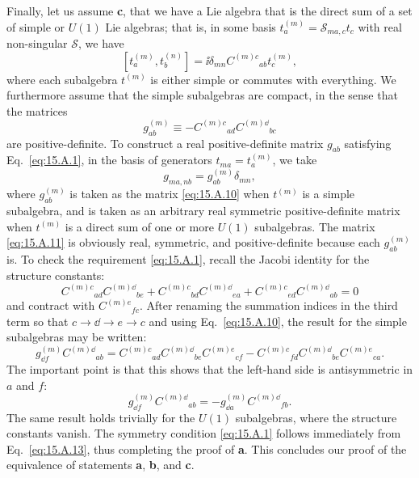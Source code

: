 Finally, let us assume \textbf{c}, that we have a Lie algebra that is the direct sum of a set of simple or $U(1)$ Lie algebras; that is, in some basis $t_a^{(m)}=\mathcal S_{ma,c}t_c$ with real non-singular $\mathcal S$, we have
\[
 [t_a^{(m)},t_b^{(n)}]
 =\ii\delta_{mn}C^{(m)c}{}_{ab}t_c^{(m)},
\]
where each subalgebra $t^{(m)}$ is either simple or commutes with everything. We furthermore assume that the simple subalgebras are compact, in the sense that the matrices
\begin{equation}
 g_{ab}^{(m)}\equiv-C^{(m)c}{}_{ad}C^{(m)\dd}{}_{bc}
 \tag{15.A.10}\label{eq:15.A.10}
\end{equation}
are positive-definite. To construct a real positive-definite matrix $g_{ab}$ satisfying Eq.~\eqref{eq:15.A.1}, in the basis of generators $t_{ma}=t_a^{(m)}$, we take
\begin{equation}
 g_{ma,nb}=g_{ab}^{(m)}\delta_{mn},
 \tag{15.A.11}\label{eq:15.A.11}
\end{equation}
where $g_{ab}^{(m)}$ is taken as the matrix \eqref{eq:15.A.10} when $t^{(m)}$ is a simple subalgebra, and is taken as an arbitrary real symmetric positive-definite matrix when $t^{(m)}$ is a direct sum of one or more $U(1)$ subalgebras. The matrix \eqref{eq:15.A.11} is obviously real, symmetric, and positive-definite because each $g_{ab}^{(m)}$ is. To check the requirement \eqref{eq:15.A.1}, recall the Jacobi identity for the structure constants:
\begin{equation}
 C^{(m)c}{}_{ad}C^{(m)\dd}{}_{be}
 +C^{(m)c}{}_{bd}C^{(m)\dd}{}_{ea}
 +C^{(m)c}{}_{ed}C^{(m)\dd}{}_{ab}=0
 \tag{15.A.12}\label{eq:15.A.12}
\end{equation}
and contract with $C^{(m)e}{}_{fc}$. After renaming the summation indices in the third term so that $c\longrightarrow \dd\longrightarrow e\longrightarrow c$ and using Eq.~\eqref{eq:15.A.10}, the result for the simple subalgebras may be written:
\[
 g_{\dd f}^{(m)}C^{(m)\dd}{}_{ab}
 =C^{(m)c}{}_{ad}C^{(m)\dd}{}_{be}C^{(m)e}{}_{cf}
 -C^{(m)c}{}_{fd}C^{(m)\dd}{}_{be}C^{(m)e}{}_{ca}.
\]
The important point is that this shows that the left-hand side is antisymmetric in $a$ and $f$:
\begin{equation}
 g_{\dd f}^{(m)}C^{(m)\dd}{}_{ab}
 =-g_{\dd a}^{(m)}C^{(m)\dd}{}_{fb}.
 \tag{15.A.13}\label{eq:15.A.13}
\end{equation}
The same result holds trivially for the $U(1)$ subalgebras, where the structure constants vanish. The symmetry condition \eqref{eq:15.A.1} follows immediately from Eq.~\eqref{eq:15.A.13}, thus completing the proof of \textbf{a}. This concludes our proof of the equivalence of statements \textbf{a}, \textbf{b}, and \textbf{c}.

